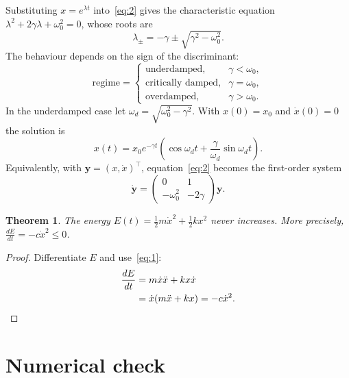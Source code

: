 \documentclass[11pt,a4paper]{article}
\newtheorem{theorem}{Theorem}
\begin{document}
Substituting $x=e^{\lambda t}$ into~\eqref{eq:2} gives the characteristic equation $\lambda^{2}+2\gamma\lambda+\omega_{0}^{2}=0$, whose roots are
\begin{equation}
  \lambda_{\pm}=-\gamma\pm\sqrt{\gamma^{2}-\omega_{0}^{2}}.
\end{equation}
The behaviour depends on the sign of the discriminant:
\begin{equation*}
  \text{regime}=\begin{cases}
\text{underdamped,} & \gamma<\omega_{0}, \\
\text{critically damped,} & \gamma=\omega_{0}, \\
\text{overdamped,} & \gamma>\omega_{0}.
\end{cases}
\end{equation*}
In the underdamped case let $\omega_{d}=\sqrt{\omega_{0}^{2}-\gamma^{2}}$. With $x(0)=x_{0}$ and $\dot{x}(0)=0$ the solution is
\begin{equation}
  x(t)=x_{0}e^{-\gamma t}\left( \cos\omega_{d}t+\frac{\gamma}{\omega_{d}}\sin\omega_{d}t \right).
  \label{eq:cos-dsin}
\end{equation}
Equivalently, with $\mathbf{y}=(x,\dot{x})^{\top}$, equation~\eqref{eq:2} becomes the first-order system
\begin{equation}
  \dot{\mathbf{y}}=\begin{pmatrix}
0 & 1 \\
-\omega_{0}^{2} & -2\gamma
\end{pmatrix}\mathbf{y}.
\end{equation}

\begin{theorem}
  The energy $E(t)=\frac{1}{2}m\dot{x}^{2}+\frac{1}{2}kx^{2}$ never increases. More precisely, $\frac{dE}{dt}=-c\dot{x}^{2}\leq0$.
\end{theorem}

\begin{proof}
  Differentiate $E$ and use~\eqref{eq:1}:
\begin{align*}
  \frac{dE}{dt} &=m\dot{x}\ddot{x}+kx\dot{x} \\
   &=\dot{x}(m\ddot{x}+kx)=-c\dot{x}^{2}. \qedhere
\end{align*}
\end{proof}

\section{Numerical check}
\end{document}
